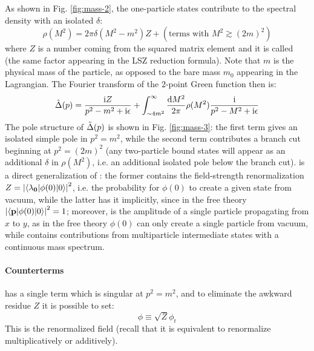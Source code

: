 As shown in Fig. \ref{fig:mass-2}, the one-particle states contribute to the spectral density with an isolated $ \delta $:
\begin{equation}
  \rho(M^2) = 2\pi \delta(M^2 - m^2) Z + (\text{terms with } M^2 \gtrsim (2m)^2)
\end{equation}
where $ Z $ is a number coming from the squared matrix element and it is called  (the same factor appearing in the LSZ reduction formula). Note that $ m $ is the physical mass of the particle, as opposed to the bare mass $ m_0 $ appearing in the Lagrangian. The Fourier transform of the $ 2 $-point Green function then is:
\begin{equation}
  \tilde{\Delta}(p) = \frac{\mathrm{i} Z}{p^2 - m^2 + \mathrm{i}\epsilon} + \int_{\sim 4m^2}^\infty \frac{\mathrm{d} M^2}{2\pi} \rho(M^2) \frac{\mathrm{i}}{p^2 - M^2 + \mathrm{i}\epsilon}
  \label{eq:corr-func-gen}
\end{equation}
The pole structure of $ \tilde{\Delta}(p) $ is shown in Fig. \ref{fig:mass-3}: the first term gives an isolated simple pole in $ p^2 = m^2 $, while the second term contributes a branch cut beginning at $ p^2 = (2m)^2 $ (any two-particle bound states will appear as an additional $ \delta $ in $ \rho(M^2) $, i.e. an additional isolated pole below the branch cut).  is a direct generalization of : the former contains the field-strength renormalization $ Z = \left\lvert\braket{\lambda_{\mathbf{0}} | \phi(0) | 0}\right\rvert^2 $, i.e. the probability for $ \phi(0) $ to create a given state from vacuum, while the latter has it implicitly, since in the free theory $ \left\lvert\braket{\mathbf{p} | \phi(0) | 0}\right\rvert^2 = 1 $; moreover,  is the amplitude of a single particle propagating from $ x $ to $ y $, as in the free theory $ \phi(0) $ can only create a single particle from vacuum, while  contains contributions from multiparticle intermediate states with a continuous mass spectrum.

\paragraph{Counterterms}

 has a single term which is singular at $ p^2 = m^2 $, and to eliminate the awkward residue $ Z $ it is possible to set:
\begin{equation}
  \phi \equiv \sqrt{Z} \phi_\text{r}
  \label{eq:phi-ren}
\end{equation}
This is the renormalized field (recall that it is equivalent to renormalize multiplicatively or additively).

